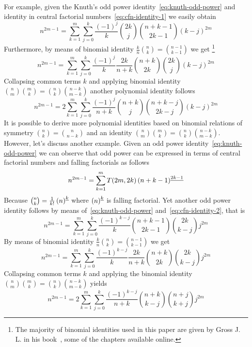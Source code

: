 For example, given the Knuth's odd power identity~\eqref{eq:knuth-odd-power}
and identity in central factorial numbers~\eqref{eq:cfn-identity-1}
we easily obtain
\begin{equation*}
    n^{2m-1} = \sum_{k=1}^{m} \sum_{j=0}^{k} \frac{(-1)^j}{k} \binom{2k}{j} \binom{n+k-1}{2k-1} (k-j)^{2m}
\end{equation*}
Furthermore, by means of binomial identity $\frac{k}{n} \binom{n}{k} = \binom{n-1}{k-1}$ we get
\footnote{The majority of binomial identities used in this paper are given by Gross J. L.
in his book~\cite{gross2016combinatorial}, some of the chapters available online.}
\begin{equation*}
    n^{2m-1} = \sum_{k=1}^{m} \sum_{j=0}^{k} \frac{(-1)^{j}}{k} \frac{2k}{n+k} \binom{n+k}{2k} \binom{2k}{j} (k-j)^{2m}
\end{equation*}
Collapsing common terms $k$ and applying binomial identity $\binom{n}{m} \binom{m}{k} = \binom{n}{k} \binom{n-k}{m-k}$
another polynomial identity follows
\begin{equation*}
    n^{2m-1} = 2\sum_{k=1}^{m} \sum_{j=0}^{k} \frac{(-1)^{j}}{n+k} \binom{n+k}{j} \binom{n+k-j}{2k-j} (k-j)^{2m}
\end{equation*}
It is possible to derive more polynomial identities based on binomial relations of symmetry $\binom{n}{k} = \binom{n}{n-k}$
and an identity $\binom{n}{m} \binom{m}{k} = \binom{n}{k} \binom{n-k}{m-k}$.
However, let's discuss another example.
Given an odd power identity~\eqref{eq:knuth-odd-power} we can observe that odd power can be expressed in terms of
central factorial numbers and falling factorials as follows
\begin{equation*}
    n^{2m-1} = \sum_{k=1}^{m} T(2m,2k) \left(n+k-1 \right)^{\underline{2k-1}}
\end{equation*}
Because $\binom{n}{k} = \frac{1}{k!} \left(n \right)^{\underline{k}}$ where $\left(n \right)^{\underline{k}}$ is falling factorial.
Yet another odd power identity follows by means of~\eqref{eq:knuth-odd-power} and~\eqref{eq:cfn-identity-2}, that is
\begin{equation*}
    n^{2m-1} = \sum_{k=1}^{m} \sum_{j=0}^{k} \frac{(-1)^{k-j}}{k} \binom{n+k-1}{2k-1} \binom{2k}{k-j} j^{2m}
\end{equation*}
By means of binomial identity $\frac{k}{n} \binom{n}{k} = \binom{n-1}{k-1}$ we get
\begin{equation*}
    n^{2m-1} = \sum_{k=1}^{m} \sum_{j=0}^{k} \frac{(-1)^{k-j}}{k} \frac{2k}{n+k} \binom{n+k}{2k} \binom{2k}{k-j} j^{2m}
\end{equation*}
Collapsing common terms $k$ and applying the binomial identity
$\binom{n}{m} \binom{m}{k} = \binom{n}{k} \binom{n-k}{m-k}$ yields
\begin{equation*}
    n^{2m-1} = 2\sum_{k=1}^{m} \sum_{j=0}^{k} \frac{(-1)^{k-j}}{n+k} \binom{n+k}{k-j} \binom{n+j}{k+j} j^{2m}
\end{equation*}